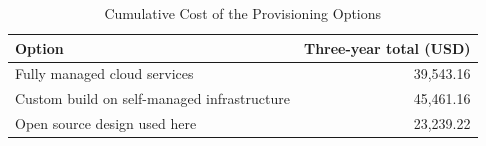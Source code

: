 
\begin{table}[!t]
\caption{Cumulative Cost of the Provisioning Options}
\label{tab:cost}
\centering
\footnotesize
\begin{tabular}{@{}>{\raggedright\arraybackslash}p{4.9cm}r@{}}
\toprule
\textbf{Option} & \textbf{Three-year total (USD)} \\
\midrule
Fully managed cloud services & 39,543.16 \\
Custom build on self-managed infrastructure & 45,461.16 \\
Open source design used here & 23,239.22 \\
\bottomrule
\end{tabular}
\end{table}
